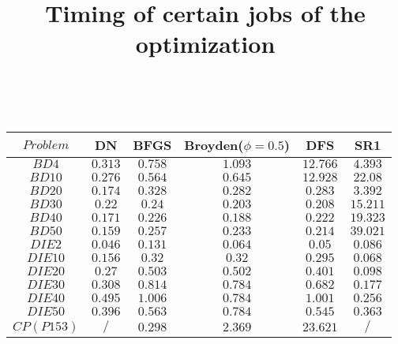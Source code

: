 \documentclass{article}
\begin{document}
\begin{table}[h!]
\title{ Timing of certain jobs of the optimization }
\\
	\centering
	\begin{tabular}{|c||c|c|c|c|c|}
		\hline
		 $Problem$ & DN & BFGS & Broyden($\phi=0.5$) & DFS & SR1 \\ \hline
		  
		 $BD4$ & $0.313$ & $0.758$ & $1.093$ & $12.766$ & $4.393$ \\ \hline
		 
		 $BD10$ & $0.276$ & $0.564$ & $0.645$ & $12.928$ & $22.08$ \\ \hline
		 
		 $BD20$ & $0.174$ & $0.328$ & $0.282$ & $0.283$ & $3.392$ \\ \hline
		 
		 $BD30$ & $0.22$ & $0.24$ & $0.203$ & $0.208$ & $15.211$ \\ \hline
		 
		 $BD40$ & $0.171$ & $0.226$ & $0.188$ & $0.222$ & $19.323$ \\ \hline
		  
		 $BD50$ & $0.159$ & $0.257$ & $0.233$ & $0.214$ & $39.021$ \\ \hline
		 
		 $DIE2$ & $0.046$ & $0.131$ & $0.064$ & $0.05$ & $0.086$ \\ \hline
		 
		 $DIE10$ & $0.156$ & $0.32$ & $0.32$ & $0.295$ & $0.068$ \\ \hline
		 
		 $DIE20$ & $0.27$ & $0.503$ & $0.502$ & $0.401$ & $0.098$ \\ \hline
		 
		 $DIE30$ & $0.308$ & $0.814$ & $0.784$ & $0.682$ & $0.177$ \\ \hline
		 
		 $DIE40$ & $0.495$ & $1.006$ & $0.784$ & $1.001$ & $0.256$ \\ \hline
		  
		 $DIE50$ & $0.396$ & $0.563$ & $0.784$ & $0.545$ & $0.363$ \\ \hline
		 
		 $CP(P153)$ & $/$ & $0.298$ & $2.369$ & $23.621$ & $/$ \\ \hline
		
	\end{tabular}

\end{table}
\end{document}
